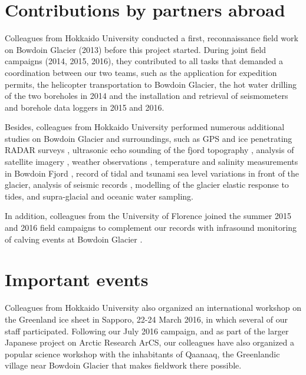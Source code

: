 \documentclass{article}
\begin{document}
\section{Contributions by partners abroad}

Colleagues from Hokkaido University conducted a first, reconnaissance field
work on Bowdoin Glacier (2013) before this project started. During joint field
campaigns (2014, 2015, 2016), they contributed to all tasks that demanded a
coordination between our two teams, such as the application for expedition
permits, the helicopter transportation to Bowdoin Glacier, the hot water
drilling of the two boreholes in 2014 and the installation and retrieval of
seismometers and borehole data loggers in 2015 and 2016.

Besides, colleagues from Hokkaido University performed numerous additional
studies on Bowdoin Glacier and surroundings, such as GPS and ice penetrating
RADAR surveys \citep{Sugiyama.etal.2015, Tsutaki.etal.2016}, ultrasonic echo
sounding of the fjord topography \citep{Sugiyama.etal.2015}, analysis of
satellite imagery \citep{Sugiyama.etal.2015, Tsutaki.etal.2016,
Sugiyama.etal.2017}, weather observations \citep{Sugiyama.etal.2015},
temperature and salinity measurements in Bowdoin Fjord
\citep{Sugiyama.etal.2017}, record of tidal and tsunami sea level variations in
front of the glacier, analysis of seismic records \citep{Podolskiy.etal.2016,
Podolskiy.etal.2017}, modelling of the glacier elastic response to tides, and
supra-glacial and oceanic water sampling.

In addition, colleagues from the University of Florence joined the summer 2015
and 2016 field campaigns to complement our records with infrasound monitoring
of calving events at Bowdoin Glacier \citep{Podolskiy.etal.2017}.


\section{Important events}

Colleagues from Hokkaido University also organized an international workshop
on the Greenland ice sheet in Sapporo, 22-24 March 2016, in which several of
our staff participated. Following our July 2016 campaign, and as part of the
larger Japanese project on Arctic Research ArCS, our colleagues have also
organized a popular science workshop with the inhabitants of Qaanaaq, the
Greenlandic village near Bowdoin Glacier that makes fieldwork there possible.



\small



\end{document}
